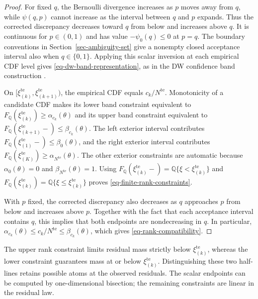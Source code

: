 \documentclass[review,11pt,3p,authoryear,nopreprintline]{elsarticle}
\begin{document}
\begin{proof}
  For fixed $q$, the Bernoulli divergence increases as $p$ moves away from $q$, while $\psi(q,p)$ cannot increase as the interval between $q$ and $p$ expands. Thus the corrected discrepancy decreases toward $q$ from below and increases above $q$. It is continuous for $p\in(0,1)$ and has value $-\psi_0(q)\le0$ at $p=q$. The boundary conventions in Section~\ref{sec-ambiguity-set} give a nonempty closed acceptance interval also when $q\in\{0,1\}$. Applying this scalar inversion at each empirical CDF level gives \eqref{eq-dw-band-representation}, as in the DW confidence band construction \citep[Supplement, Section~S.6]{L.J23}.

  On $[\xi_{(k)}^{\mathrm{te}},\xi_{(k+1)}^{\mathrm{te}})$, the empirical CDF equals $c_k/N^{\mathrm{te}}$. Monotonicity of a candidate CDF makes its lower band constraint equivalent to $F_{\mathbb Q}\left(\xi_{(k)}^{\mathrm{te}}\right)\ge\alpha_{c_k}(\theta)$ and its upper band constraint equivalent to $F_{\mathbb Q}\left(\xi_{(k+1)}^{\mathrm{te}}-\right)\le\beta_{c_k}(\theta)$. The left exterior interval contributes $F_{\mathbb Q}\left(\xi_{(1)}^{\mathrm{te}}-\right)\le\beta_0(\theta)$, and the right exterior interval contributes $F_{\mathbb Q}\left(\xi_{(K)}^{\mathrm{te}}\right)\ge\alpha_{N^{\mathrm{te}}}(\theta)$. The other exterior constraints are automatic because $\alpha_0(\theta)=0$ and $\beta_{N^{\mathrm{te}}}(\theta)=1$. Using $F_{\mathbb Q}\left(\xi_{(k)}^{\mathrm{te}}-\right)=\mathbb Q\{\xi<\xi_{(k)}^{\mathrm{te}}\}$ and $F_{\mathbb Q}\left(\xi_{(k)}^{\mathrm{te}}\right)=\mathbb Q\{\xi\le \xi_{(k)}^{\mathrm{te}}\}$ proves \eqref{eq-finite-rank-constraints}.

  With $p$ fixed, the corrected discrepancy also decreases as $q$ approaches $p$ from below and increases above $p$. Together with the fact that each acceptance interval contains $q$, this implies that both endpoints are nondecreasing in $q$. In particular,
  $\alpha_{c_k}(\theta)\le c_k/N^{\mathrm{te}}\le\beta_{c_k}(\theta)$, which gives \eqref{eq-rank-compatibility}.
\end{proof}

The upper rank constraint limits residual mass strictly below $\xi_{(k)}^{\mathrm{te}}$, whereas the lower constraint guarantees mass at or below $\xi_{(k)}^{\mathrm{te}}$. Distinguishing these two half-lines retains possible atoms at the observed residuals. The scalar endpoints can be computed by one-dimensional bisection; the remaining constraints are linear in the residual law.
\end{document}
